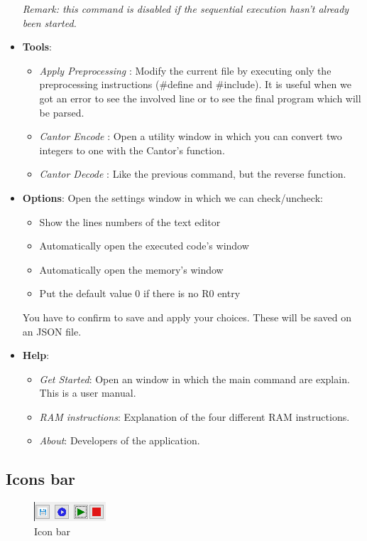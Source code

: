 \begin{itemize}
    \textit{Remark: this command is disabled if the sequential execution hasn't already been started.}
    \item \textbf{Tools}:
    \begin{itemize}
        \item \textit{Apply Preprocessing} : Modify the current file by executing only the preprocessing instructions (\#define and \#include). It is useful
        when we got an error to see the involved line or to see the final program which will be parsed.
        \item \textit{Cantor Encode} : Open a utility window in which you can convert two integers to one with the Cantor's function.
        \item \textit{Cantor Decode} : Like the previous command, but the reverse function.
    \end{itemize}
    \item \textbf{Options}: Open the settings window in which we can check/uncheck:
    \begin{itemize}
        \item Show the lines numbers of the text editor
        \item Automatically open the executed code's window
        \item Automatically open the memory's window
        \item Put the default value 0 if there is no R0 entry
    \end{itemize}
    You have to confirm to save and apply your choices. These will be saved on an JSON file.
    \item \textbf{Help}:
    \begin{itemize}
        \item \textit{Get Started}: Open an window in which the main command are explain. This is a user manual.
        \item \textit{RAM instructions}: Explanation of the four different RAM instructions.
        \item \textit{About}: Developers of the application.
    \end{itemize}
\end{itemize}

\subsection{Icons bar}

\begin{figure}[h]%
    \centering
    \includegraphics{images/menu/menu_icons.png}%
    \caption{Icon bar}%
    \label{fig:icon_bar}%
\end{figure}

